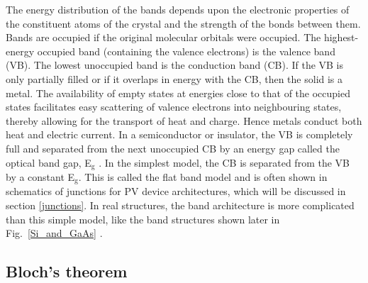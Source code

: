 \documentclass[11pt, twoside]{report}
\begin{document}
The energy distribution of the bands depends upon the electronic properties of the constituent atoms of the crystal and the strength of the bonds between them. Bands are occupied if the original molecular orbitals were occupied. The highest-energy occupied band (containing the valence electrons) is the valence band (VB). The lowest unoccupied band is the conduction band (CB). If the VB is only partially filled or if it overlaps in energy with the CB, then the solid is a metal. The availability of empty states at energies close to that of the occupied states facilitates easy scattering of valence electrons into neighbouring states, thereby allowing for the transport of heat and charge. Hence metals conduct both heat and electric current. In a semiconductor or insulator, the VB is completely full and separated from the next unoccupied CB by an energy gap called the optical band gap, E$_\mathrm{g}$ \cite{Nelson3}. In the simplest model, the CB is separated from the VB by a constant E$_\mathrm{g}$. This is called the flat band model and is often shown in schematics of junctions for PV device architectures, which will be discussed in section \ref{junctions}. In real structures, the band architecture is more complicated than this simple model, like the band structures shown later in Fig.~\ref{Si_and_GaAs} \cite{Tilley}.


\subsection{Bloch's theorem}
\end{document}
